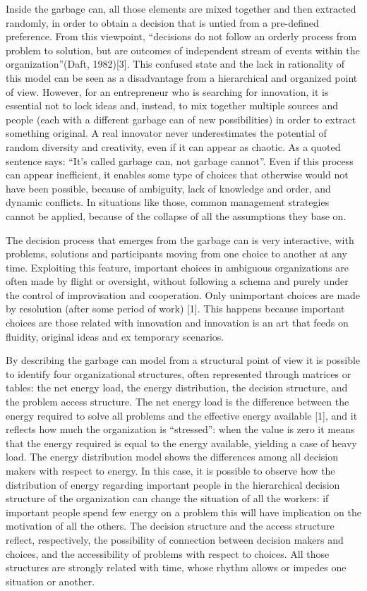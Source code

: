 Inside the garbage can, all those elements are mixed together and then extracted randomly, in order to obtain a decision that is untied from a pre-defined preference. From this viewpoint, “decisions do not follow an orderly process from problem to solution, but are outcomes of independent stream of events within the organization”(Daft, 1982)[3]. This confused state and the lack in rationality of this model can be seen as a disadvantage from a hierarchical and organized point of view. However, for an entrepreneur who is searching for innovation, it is essential not to lock ideas and, instead, to mix together multiple sources and people (each with a different garbage can of new possibilities) in order to extract something original. A real innovator never underestimates the potential of random diversity and creativity, even if it can appear as chaotic. As a quoted sentence says: “It’s called garbage can, not garbage cannot”. Even if this process can appear inefficient, it enables some type of choices that otherwise would not have been possible, because of ambiguity, lack of knowledge and order, and dynamic conflicts. In situations like those, common management strategies cannot be applied, because of the collapse of all the assumptions they base on.

The decision process that emerges from the garbage can is very interactive, with problems, solutions and participants moving from one choice to another at any time. Exploiting this feature, important choices in ambiguous organizations are often made by flight or oversight, without following a schema and purely under the control of improvisation and cooperation. Only unimportant choices are made by resolution (after some period of work) [1]. This happens because important choices are those related with innovation and innovation is an art that feeds on fluidity, original ideas and ex temporary scenarios.

By describing the garbage can model from a structural point of view it is possible to identify four organizational structures, often represented through matrices or tables: the net energy load, the energy distribution, the decision structure, and the problem access structure. The net energy load is the difference between the energy required to solve all problems and the effective energy available [1], and it reflects how much the organization is “stressed”: when the value is zero it means that the energy required is equal to the energy available, yielding a case of heavy load. The energy distribution model shows the differences among all decision makers with respect to energy. In this case, it is possible to observe how the distribution of energy regarding important people in the hierarchical decision structure of the organization can change the situation of all the workers: if important people spend few energy on a problem this will have implication on the motivation of all the others. The decision structure and the access structure reflect, respectively, the possibility of connection between decision makers and choices, and the accessibility of problems with respect to choices. All those structures are strongly related with time, whose rhythm allows or impedes one situation or another.

